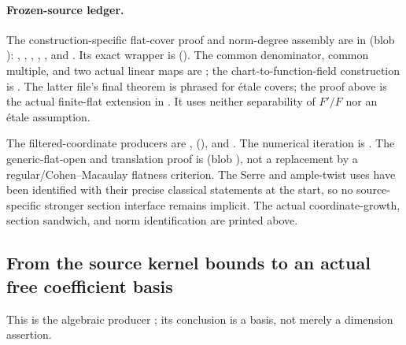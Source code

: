 \paragraph{Frozen-source ledger.}
The construction-specific flat-cover proof and norm-degree
assembly are in
\href{https://github.com/ChristianKudeba/alpoge-rh-verification/blob/alpoge-source-7cbf7a0c/src/Development/WeilBound/CoreStatements/TorusUniformisation/ChowMahlerFamilies/DegreeMultiplicationNorm.lean}
{}
(blob ):
, ,
, ,
, and .
Its exact wrapper is
().
The common denominator, common multiple, and two actual
linear maps are
;
the chart-to-function-field construction is
.
The latter file's final theorem is phrased for \'etale
covers; the  proof above is the actual
finite-flat extension in .
It uses neither separability of \(F'/F\) nor an \'etale
assumption.

The filtered-coordinate producers are
,
(), and
.
The numerical iteration is
.
The generic-flat-open and translation proof is
(blob ),
not a replacement by a regular/Cohen--Macaulay flatness criterion.
The Serre and ample-twist uses have been identified with
their precise classical statements at the start, so no
source-specific stronger section interface remains implicit.
The actual coordinate-growth, section sandwich, and norm
identification are printed above.


\subsection{From the source kernel bounds to an actual free coefficient basis}
\label{subsec:faithful-kernel-norm-free}

This is the algebraic producer
; its conclusion is a basis, not
merely a dimension assertion.

